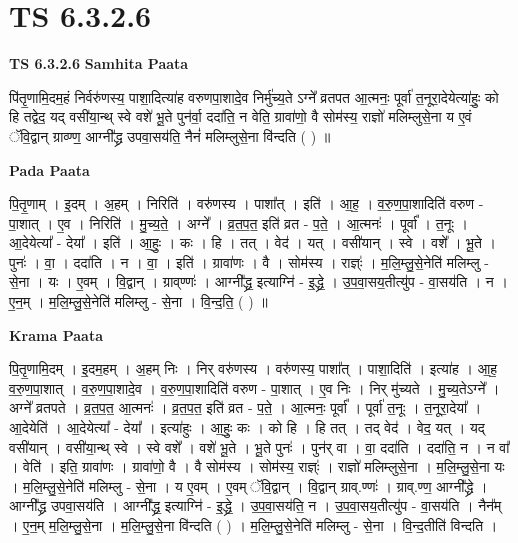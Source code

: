 \documentclass[17pt]{extarticle}
\begin{document}
\section{ TS 6.3.2.6 }

\textbf{TS 6.3.2.6 } \newline
\textbf{Samhita Paata} \newline

पि॑तृ॒णामि॒दम॒हं निर्वरु॑णस्य॒ पाशा॒दित्या॑ह वरुणपा॒शादे॒व निर्मु॑च्य॒ते ऽग्ने᳚ व्रतपत आ॒त्मनः॒ पूर्वा॑ त॒नूरा॒देयेत्या॑हुः॒ को हि तद्वेद॒ यद् वसी॑या॒न्थ् स्वे वशे॑ भू॒ते पुन॑र्वा॒ ददा॑ति॒ न वेति॒ ग्रावा॑णो॒ वै सोम॑स्य॒ राज्ञो॑ मलिम्लुसे॒ना य ए॒वं ॅवि॒द्वान् ग्राव्ण्ण॒॒ आग्नी᳚द्ध्र उपवा॒सय॑ति॒ नैनं॑ मलिम्लुसे॒ना वि॑न्दति ( ) ॥ \newline

\textbf{Pada Paata} \newline

पि॒तृ॒णाम् । इ॒दम् । अ॒हम् । निरिति॑ । वरु॑णस्य । पाशा᳚त् । इति॑ । आ॒ह॒ । व॒रु॒ण॒पा॒शादिति॑ वरुण - पा॒शात् । ए॒व । निरिति॑ । मु॒च्य॒ते॒ । अग्ने᳚ । व्र॒त॒प॒त॒ इति॑ व्रत - प॒ते॒ । आ॒त्मनः॑ । पूर्वा᳚ । त॒नूः । आ॒देयेत्या᳚ - देया᳚ । इति॑ । आ॒हुः॒ । कः । हि । तत् । वेद॑ । यत् । वसी॑यान् । स्वे । वशे᳚ । भू॒ते । पुनः॑ । वा॒ । ददा॑ति । न । वा॒ । इति॑ । ग्रावा॑णः । वै । सोम॑स्य । राज्ञ्ः॑ । म॒लि॒म्लु॒से॒नेति॑ मलिम्लु - से॒ना । यः । ए॒वम् । वि॒द्वान् । ग्राव्‌ण्णः॑  । आग्नी᳚द्ध्र॒ इत्याग्नि॑ - इ॒द्ध्रे॒ । उ॒प॒वा॒सय॒तीत्यु॑प - वा॒सय॑ति । न । ए॒न॒म् । म॒लि॒म्लु॒से॒नेति॑ मलिम्लु - से॒ना । वि॒न्द॒ति॒ ( ) ॥  \newline


\textbf{Krama Paata} \newline

पि॒तृ॒णामि॒दम् । इ॒दम॒हम् । अ॒हम् निः । निर् वरु॑णस्य । वरु॑णस्य॒ पाशा᳚त् । पाशा॒दिति॑ । इत्या॑ह । आ॒ह॒ व॒रु॒ण॒पा॒शात् । व॒रु॒ण॒पा॒शादे॒व । व॒रु॒ण॒पा॒शादिति॑ वरुण - पा॒शात् । ए॒व निः । निर् मु॑च्यते । मु॒च्य॒तेऽग्ने᳚ । अग्ने᳚ व्रतपते । व्र॒त॒प॒त॒ आ॒त्मनः॑ । व्र॒त॒प॒त॒ इति॑ व्रत - प॒ते॒ । आ॒त्मनः॒ पूर्वा᳚ । पूर्वा॑ त॒नूः । त॒नूरा॒देया᳚ । आ॒देयेति॑ । आ॒देयेत्या᳚ - देया᳚ । इत्या॑हुः । आ॒हुः॒ कः । को हि । हि तत् । तद् वेद॑ । वेद॒ यत् । यद् वसी॑यान् । वसी॑या॒न्थ् स्वे । स्वे वशे᳚ । वशे॑ भू॒ते । भू॒ते पुनः॑ । पुन॑र् वा । वा॒ ददा॑ति । ददा॑ति॒ न । न वा᳚ । वेति॑ । इति॒ ग्रावा॑णः । ग्रावा॑णो॒ वै । वै सोम॑स्य । सोम॑स्य॒ राज्ञ्ः॑ । राज्ञो॑ मलिम्लुसे॒ना । म॒लि॒म्लु॒से॒ना यः । म॒लि॒म्लु॒से॒नेति॑ मलिम्लु - से॒ना । य ए॒वम् । ए॒वम् ॅवि॒द्वान् । वि॒द्वान् ग्राव्.ण्णः॑ । ग्राव्.ण्ण॒ आग्नी᳚द्ध्रे । आग्नी᳚द्ध्र उपवा॒सय॑ति । आग्नी᳚द्ध्र॒ इत्याग्नि॑ - इ॒द्ध्रे॒ । उ॒प॒वा॒सय॑ति॒ न । उ॒प॒वा॒सय॒तीत्यु॑प - वा॒सय॑ति । नैन᳚म् । ए॒न॒म् म॒लि॒म्लु॒से॒ना । म॒लि॒म्लु॒से॒ना वि॑न्दति ( ) । म॒लि॒म्लु॒से॒नेति॑ मलिम्लु - से॒ना । वि॒न्द॒तीति॑ विन्दति । \newline
\end{document}
